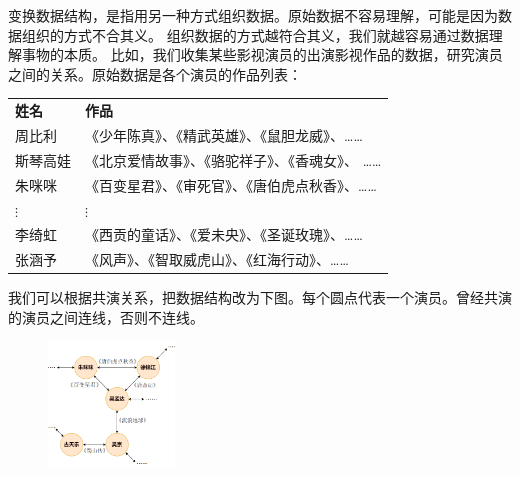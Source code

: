 \documentclass[12pt,UTF8]{ctexbook}
\begin{document}
变换数据结构，是指用另一种方式组织数据。原始数据不容易理解，可能是因为数据组织的方式不合其义。
组织数据的方式越符合其义，我们就越容易通过数据理解事物的本质。
比如，我们收集某些影视演员的出演影视作品的数据，研究演员之间的关系。原始数据是各个演员的作品列表：
\begin{center}
    \begin{tabular}{ p{4em}<{\centering} !{\color{white} \vrule width 2pt} p{22em}<{\centering} }
         \textbf{姓名} & \textbf{作品} \\ [0.5ex] 
         周比利 & 《少年陈真》、《精武英雄》、《鼠胆龙威》、…… \\  
         斯琴高娃 & 《北京爱情故事》、《骆驼祥子》、《香魂女》、 …… \\  
         朱咪咪 & 《百变星君》、《审死官》、《唐伯虎点秋香》、…… \\  
         $\vdots$ & $\vdots$ \\  
         李绮虹 & 《西贡的童话》、《爱未央》、《圣诞玫瑰》、…… \\  
         张涵予 & 《风声》、《智取威虎山》、《红海行动》、…… \\  
    \end{tabular}
\end{center}

我们可以根据共演关系，把数据结构改为下图。每个圆点代表一个演员。曾经共演的演员之间连线，否则不连线。
\begin{figure}[H] %
    \vspace{8pt}
    \centering
    \includegraphics[width=0.3\textwidth]{演员关系图1.png}
\end{figure}
\end{document}
